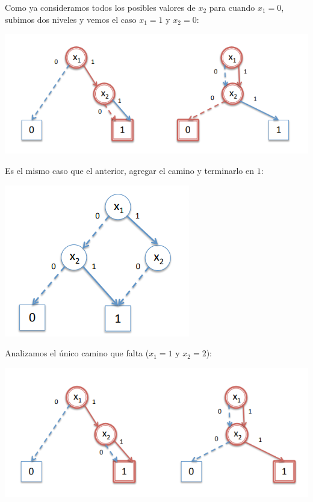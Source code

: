 Como ya consideramos todos los posibles valores de $x_2$ para cuando $x_1 = 0$, subimos dos niveles y vemos el caso $x_1 = 1$ y $x_2 = 0$:

\begin{center}
	\includegraphics[scale=0.35]{imagenes/compo-robdd8}
\end{center}

Es el mismo caso que el anterior, agregar el camino y terminarlo en $1$:

\begin{center}
	\includegraphics[scale=0.35]{imagenes/compo-robdd9}
\end{center}

Analizamos el único camino que falta ($x_1 = 1$ y $x_2 = 2$):
\begin{center}
	\includegraphics[scale=0.35]{imagenes/compo-robdd10}
\end{center}


